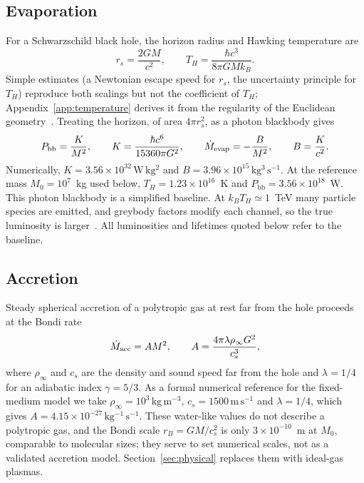 \documentclass[11pt,a4paper]{article}
\newcommand{\Pbb}{P_{\mathrm{bb}}}
\begin{document}
\subsection{Evaporation}
For a Schwarzschild black hole, the horizon radius and Hawking temperature are
\begin{equation}
 r_s=\frac{2GM}{c^2},\qquad T_H=\frac{\hbar c^3}{8\pi GMk_B}.
 \label{eq:temperature}
\end{equation}
Simple estimates (a Newtonian escape speed for $r_s$, the uncertainty principle for $T_H$) reproduce both scalings but not the coefficient of $T_H$; Appendix~\ref{app:temperature} derives it from the regularity of the Euclidean geometry~\cite{gibbons,genolini}. Treating the horizon, of area $4\pi r_s^2$, as a photon blackbody gives
\begin{equation}
 \Pbb=\frac{K}{M^2},\qquad K=\frac{\hbar c^6}{15360\pi G^2},\qquad
 \dot M_{\rm evap}=-\frac{B}{M^2},\qquad B=\frac{K}{c^2}.
 \label{eq:power}
\end{equation}
Numerically, $K=3.56\times10^{32}\,\mathrm{W\,kg^2}$ and $B=3.96\times10^{15}\,\mathrm{kg^3\,s^{-1}}$. At the reference mass $M_0=10^7$~kg used below, $T_H=1.23\times10^{16}$~K and $\Pbb=3.56\times10^{18}$~W. This photon blackbody is a simplified baseline. At $k_BT_H\simeq1$~TeV many particle species are emitted, and greybody factors modify each channel, so the true luminosity is larger~\cite{page,macgibbon}. All luminosities and lifetimes quoted below refer to the baseline.

\subsection{Accretion}
Steady spherical accretion of a polytropic gas at rest far from the hole proceeds at the Bondi rate~\cite{bondi}
\begin{equation}
 \dot M_{\rm acc}=AM^2,\qquad A=\frac{4\pi\lambda\rho_\infty G^2}{c_s^3},
 \label{eq:bondi}
\end{equation}
where $\rho_\infty$ and $c_s$ are the density and sound speed far from the hole and $\lambda=1/4$ for an adiabatic index $\gamma=5/3$. As a formal numerical reference for the fixed-medium model we take $\rho_\infty=10^3\,\mathrm{kg\,m^{-3}}$, $c_s=1500\,\mathrm{m\,s^{-1}}$ and $\lambda=1/4$, which gives $A=4.15\times10^{-27}\,\mathrm{kg^{-1}\,s^{-1}}$. These water-like values do not describe a polytropic gas, and the Bondi scale $r_B=GM/c_s^2$ is only $3\times10^{-10}$~m at $M_0$, comparable to molecular sizes; they serve to set numerical scales, not as a validated accretion model. Section~\ref{sec:physical} replaces them with ideal-gas plasmas.
\end{document}
